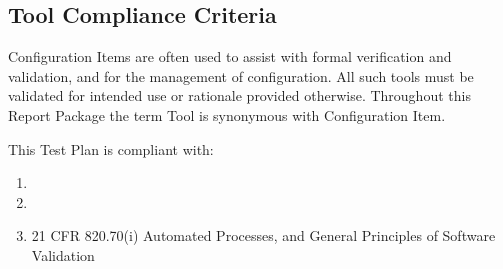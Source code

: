 \subsection{Tool Compliance Criteria}
Configuration Items are often used to assist with formal verification and
validation, and for the management of configuration.  All such tools must be
validated for intended use or rationale provided otherwise.  Throughout this
Report Package the term Tool is synonymous with Configuration Item.

This Test Plan is compliant with:
\begin{enumerate}
  \item \sopSDLC
  \item \sopSCM
  \item 21 CFR 820.70(i) Automated Processes, and General Principles of Software
    Validation
\end{enumerate}

